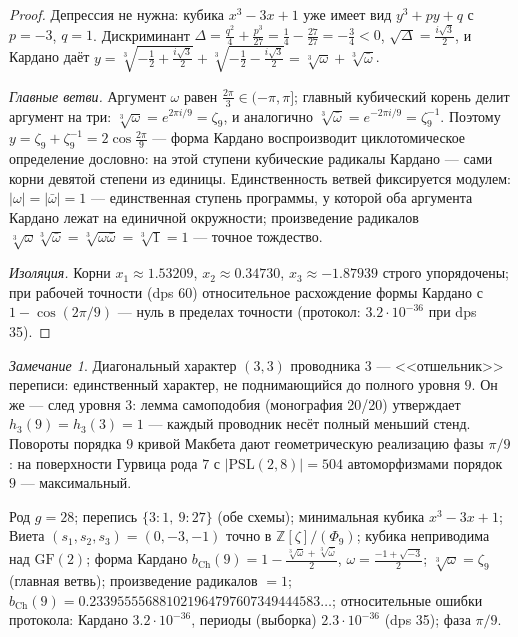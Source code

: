 \documentclass[11pt,a4paper]{article}
\theoremstyle{plain}
\theoremstyle{definition}
\theoremstyle{remark}
\newtheorem{remark}[theorem]{Замечание}
\newcommand{\ZZ}{\mathbb{Z}}
\begin{document}
\begin{proof}
Депрессия не нужна: кубика $x^3-3x+1$ уже имеет вид $y^3+py+q$
с $p=-3$, $q=1$. Дискриминант
$\Delta=\frac{q^2}{4}+\frac{p^3}{27}=\frac14-\frac{27}{27}
=-\frac34<0$, $\sqrt\Delta=\frac{i\sqrt3}{2}$, и Кардано даёт
$y=\sqrt[3]{-\frac12+\frac{i\sqrt3}{2}}+\sqrt[3]{-\frac12-\frac{i\sqrt3}{2}}
=\sqrt[3]{\omega}+\sqrt[3]{\bar\omega}$.

\emph{Главные ветви.} Аргумент $\omega$ равен $\frac{2\pi}{3}\in(-\pi,\pi]$;
главный кубический корень делит аргумент на три:
$\sqrt[3]{\omega}=e^{2\pi i/9}=\zeta_9$, и аналогично
$\sqrt[3]{\bar\omega}=e^{-2\pi i/9}=\zeta_9^{-1}$. Поэтому
$y=\zeta_9+\zeta_9^{-1}=2\cos\frac{2\pi}{9}$ --- форма Кардано
воспроизводит циклотомическое определение дословно: на этой
ступени кубические радикалы Кардано --- сами корни девятой
степени из единицы. Единственность ветвей фиксируется модулем:
$|\omega|=|\bar\omega|=1$ --- единственная ступень программы, у
которой оба аргумента Кардано лежат на единичной окружности;
произведение радикалов
$\sqrt[3]{\omega}\sqrt[3]{\bar\omega}=\sqrt[3]{\omega\bar\omega}
=\sqrt[3]{1}=1$ --- точное тождество.

\emph{Изоляция.} Корни $x_1\approx1.53209$,
$x_2\approx0.34730$, $x_3\approx-1.87939$ строго упорядочены;
при рабочей точности (dps 60) относительное расхождение формы
Кардано с $1-\cos(2\pi/9)$ --- нуль в пределах точности
(протокол: $3.2\cdot10^{-36}$ при dps 35).
\end{proof}

\begin{remark}
Диагональный характер $(3,3)$ проводника $3$ --- <<отшельник>>
переписи: единственный характер, не поднимающийся до полного
уровня $9$. Он же --- след уровня $3$: лемма самоподобия
(монография 20/20) утверждает $h_3(9)=h_3(3)=1$ --- каждый
проводник несёт полный меньший стенд. Повороты порядка $9$
кривой Макбета дают геометрическую реализацию фазы $\pi/9$: на
поверхности Гурвица рода $7$ с $|\mathrm{PSL}(2,8)|=504$
автоморфизмами порядок $9$ --- максимальный.
\end{remark}

\begin{databox}
Род $g=28$; перепись $\{3\colon 1,\ 9\colon 27\}$ (обе схемы);
минимальная кубика $x^3-3x+1$; Виета $(s_1,s_2,s_3)=(0,-3,-1)$
точно в $\ZZ[\zeta]/(\Phi_9)$; кубика неприводима над
$\mathrm{GF}(2)$; форма Кардано
$b_{\mathrm{Ch}}(9)=1-\frac{\sqrt[3]{\omega}+\sqrt[3]{\bar\omega}}{2}$,
$\omega=\frac{-1+\sqrt{-3}}{2}$;
$\sqrt[3]{\omega}=\zeta_9$ (главная ветвь); произведение
радикалов $=1$;
$b_{\mathrm{Ch}}(9)=0.233955556881021964797607349444583\ldots$;
относительные ошибки протокола: Кардано $3.2\cdot10^{-36}$,
периоды (выборка) $2.3\cdot10^{-36}$ (dps 35); фаза $\pi/9$.
\end{databox}
\end{document}
